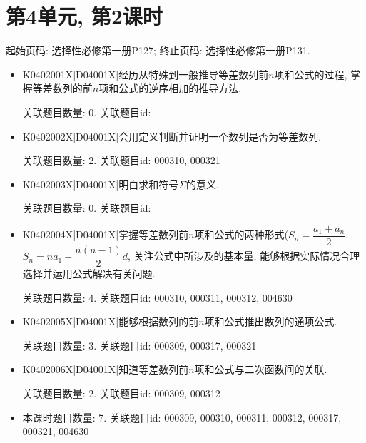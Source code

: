 \section*{第4单元, 第2课时}
起始页码: 选择性必修第一册P127; 终止页码: 选择性必修第一册P131.
\begin{itemize}
\item K0402001X|D04001X|经历从特殊到一般推导等差数列前$n$项和公式的过程, 掌握等差数列的前$n$项和公式的逆序相加的推导方法.

关联题目数量: 0. 关联题目id: 

\item K0402002X|D04001X|会用定义判断并证明一个数列是否为等差数列.

关联题目数量: 2. 关联题目id: 000310, 000321

\item K0402003X|D04001X|明白求和符号$\Sigma$的意义.

关联题目数量: 0. 关联题目id: 

\item K0402004X|D04001X|掌握等差数列前$n$项和公式的两种形式($S_{n}=\dfrac{a_{1}+a_{n}}{2}$, $S_{n}=na_{1}+\dfrac{n(n-1)}{2}d$, 关注公式中所涉及的基本量, 能够根据实际情况合理选择并运用公式解决有关问题.

关联题目数量: 4. 关联题目id: 000310, 000311, 000312, 004630

\item K0402005X|D04001X|能够根据数列的前$n$项和公式推出数列的通项公式.

关联题目数量: 3. 关联题目id: 000309, 000317, 000321

\item K0402006X|D04001X|知道等差数列前$n$项和公式与二次函数间的关联.

关联题目数量: 2. 关联题目id: 000309, 000312

\item 本课时题目数量: 7. 关联题目id: 000309, 000310, 000311, 000312, 000317, 000321, 004630

\end{itemize}

